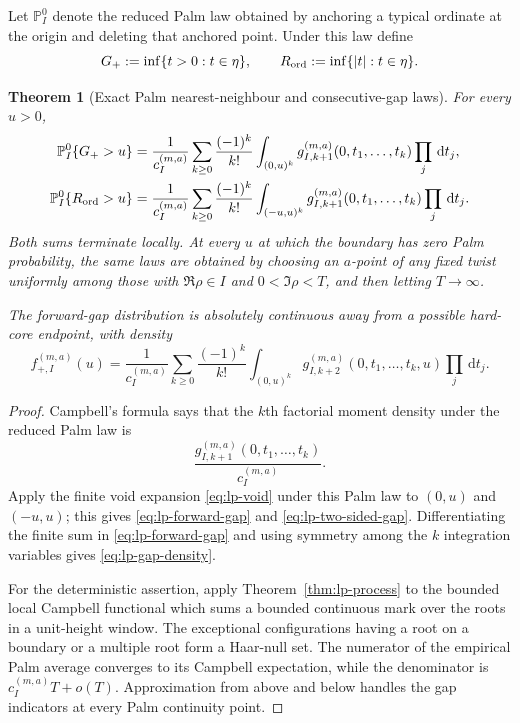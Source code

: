 \documentclass[11pt]{article}
\newtheorem{theorem}{Theorem}[section]
\theoremstyle{definition}
\theoremstyle{remark}
\newcommand{\dd}{\,\mathrm d}
\begin{document}
Let ${\mathbb P}_I^0$ denote the reduced Palm law obtained by anchoring a
typical ordinate at the origin and deleting that anchored point.  Under this
law define
\[
 G_+:=\inf\{t>0:t\in\eta\},
 \qquad
 R_{\rm ord}:=\inf\{|t|:t\in\eta\}.
\]

\begin{theorem}[Exact Palm nearest-neighbour and consecutive-gap laws]
\label{thm:lp-palm}
For every $u>0$,
\begin{align}
 {\mathbb P}_I^0\{G_+>u\}
 &=\frac1{c_I^{(m,a)}}
   \sum_{k\geq0}\frac{(-1)^k}{k!}
   \int_{(0,u)^k}g_{I,k+1}^{(m,a)}(0,t_1,\ldots,t_k)
   \prod_j\dd t_j,                                      
 \label{eq:lp-forward-gap}\\
 {\mathbb P}_I^0\{R_{\rm ord}>u\}
 &=\frac1{c_I^{(m,a)}}
   \sum_{k\geq0}\frac{(-1)^k}{k!}
   \int_{(-u,u)^k}g_{I,k+1}^{(m,a)}(0,t_1,\ldots,t_k)
   \prod_j\dd t_j.
 \label{eq:lp-two-sided-gap}
\end{align}
Both sums terminate locally.  At every $u$ at which the boundary has zero Palm
probability, the same laws are obtained by choosing an $a$-point of any fixed
twist uniformly among those with $\Re\rho\in I$ and $0<\Im\rho<T$, and then
letting $T\to\infty$.

The forward-gap distribution is absolutely continuous away from a possible
hard-core endpoint, with density
\begin{equation}
 \boxed{
 f_{+,I}^{(m,a)}(u)
 =\frac1{c_I^{(m,a)}}
  \sum_{k\geq0}\frac{(-1)^k}{k!}
  \int_{(0,u)^k}
  g_{I,k+2}^{(m,a)}(0,t_1,\ldots,t_k,u)
  \prod_j\dd t_j.
 }
 \label{eq:lp-gap-density}
\end{equation}
\end{theorem}

\begin{proof}
Campbell's formula says that the $k$th factorial moment density under the
reduced Palm law is
\[
 \frac{g_{I,k+1}^{(m,a)}(0,t_1,\ldots,t_k)}{c_I^{(m,a)}}.
\]
Apply the finite void expansion \eqref{eq:lp-void} under this Palm law to
$(0,u)$ and $(-u,u)$; this gives \eqref{eq:lp-forward-gap} and
\eqref{eq:lp-two-sided-gap}.  Differentiating the finite sum in
\eqref{eq:lp-forward-gap} and using symmetry among the $k$ integration
variables gives \eqref{eq:lp-gap-density}.

For the deterministic assertion, apply Theorem~\ref{thm:lp-process} to the
bounded local Campbell functional which sums a bounded continuous mark over
the roots in a unit-height window.  The exceptional configurations having a
root on a boundary or a multiple root form a Haar-null set.  The numerator of
the empirical Palm average converges to its Campbell expectation, while the
denominator is $c_I^{(m,a)}T+o(T)$.  Approximation from above and below handles
the gap indicators at every Palm continuity point.
\end{proof}
\end{document}
